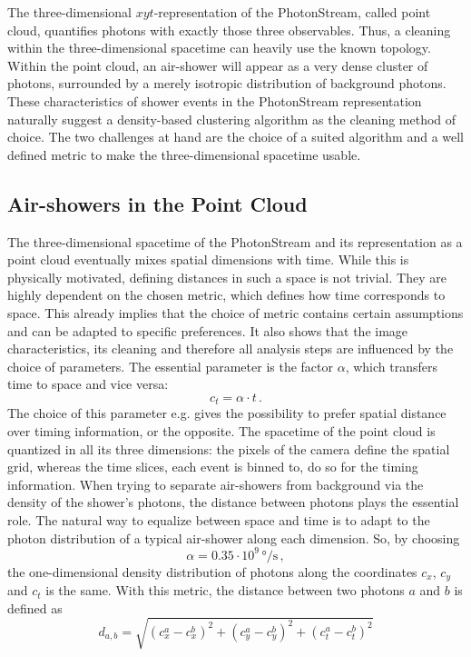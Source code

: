 The three-dimensional $xyt$-representation of the PhotonStream, called point cloud, quantifies photons with exactly those three observables. Thus, a cleaning
within the three-dimensional spacetime can heavily use the known topology.
Within the point cloud, an air-shower will appear as a very dense cluster of
photons, surrounded by a merely isotropic distribution of background photons.
These characteristics of shower events in the PhotonStream representation
naturally suggest a density-based clustering algorithm as the cleaning method
of choice. The two challenges at hand are the choice of a suited algorithm and
a well defined metric to make the three-dimensional spacetime usable.

\subsection{Air-showers in the Point Cloud}
%
The three-dimensional spacetime of the PhotonStream and its representation as a
point cloud eventually mixes spatial dimensions with time. While this is
physically motivated, defining distances in such a space is not trivial. They
are highly dependent on the chosen metric, which defines how time corresponds to
space. This already implies that the choice of metric contains certain
assumptions and can be adapted to specific preferences. It also shows that the
image characteristics, its cleaning and therefore all analysis steps are
influenced by the choice of parameters. The essential parameter
is the factor $\alpha$, which transfers time to space and vice versa:
%
\begin{equation}
  c_{t} = \alpha \cdot t \, .
  \label{eq:metric}
\end{equation}
%
The choice of this parameter e.g. gives the possibility to prefer spatial
distance over timing information, or the opposite. The spacetime of the
point cloud is quantized in all its three dimensions: the pixels of the camera
define the spatial grid, whereas the time slices, each event is binned to, do so
for the timing information. When trying to separate air-showers from
background via the density of the shower's photons, the distance between photons plays the
essential role. The natural way to equalize between space and time is to adapt
to the photon distribution of a typical air-shower along each dimension. So, by
choosing
%
\begin{equation}
  \alpha = 0.35\cdot10^9\,\si{\degree\per\second}\, ,
\end{equation}
%
the one-dimensional density distribution of photons along the coordinates
$c_x$, $c_y$ and $c_t$ is the same. With this metric, the distance between two
photons $a$ and $b$ is defined as
%
\begin{equation}
  d_{a,b} = \sqrt{(c_x^a - c_x^b)^2 + (c_y^a - c_y^b)^2 + (c_t^a - c_t^b)^2}
\end{equation}

